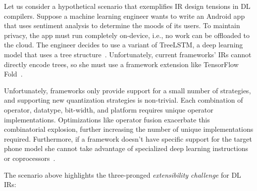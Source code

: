   Let us consider a hypothetical scenario that exemplifies
    IR design tensions in DL compilers.
  Suppose a machine learning engineer wants to write
    an Android app that uses sentiment analysis to
    determine the moods of its users.
  To maintain privacy, the app must run completely on-device,
    i.e., no work can be offloaded to the cloud.
  The engineer decides to use a variant of TreeLSTM,
    a deep learning model that uses a tree structure~\cite{tree_lstm}.
  Unfortunately, current frameworks' IRs cannot directly encode trees,
    so she must use a framework extension
    like TensorFlow Fold~\cite{tensorflowfold}.

  Unfortunately, frameworks only provide support for a small number
    of strategies, and supporting new quantization strategies is non-trivial.
  Each combination of operator, datatype, bit-width, and
    platform requires unique operator implementations.
  Optimizations like operator fusion exacerbate this combinatorial explosion,
    further increasing
    the number of unique implementations required.
  Furthermore, if a framework doesn't have specific support for
    the target phone model she cannot take advantage of specialized deep learning
    instructions or coprocessors~\cite{apple_neural_engine}.

  The scenario above highlights the three-pronged \textit{extensibility challenge}
    for DL IRs:

